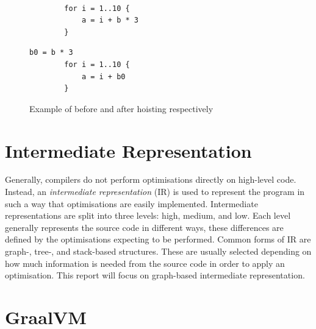 \documentclass[12pt,openany,a4paper]{book}
\begin{document}
\begin{figure}
    \begin{minipage}[l]{0.4\linewidth}
        \begin{lstlisting}[frame=single, basicstyle=\ttfamily\small, tabsize=1, columns=fullflexible]

        for i = 1..10 {
            a = i + b * 3
        }
        \end{lstlisting}
    \end{minipage}
    \hspace{0.18\textwidth}
    \begin{minipage}[l]{0.4\linewidth}
        \begin{lstlisting}[frame=single, basicstyle=\ttfamily\small, tabsize=1, columns=fullflexible]
        b0 = b * 3
        for i = 1..10 {
            a = i + b0
        }
        \end{lstlisting}
    \end{minipage}
    \caption{Example of before and after hoisting respectively}
    \label{hoist}
\end{figure}

\section{Intermediate Representation}
\label{ir}

Generally, compilers do not perform optimisations directly on high-level code.
Instead, an \emph{intermediate representation} (IR) is used to represent the
program in such a way that optimisations are easily implemented. Intermediate
representations are split into three levels: high, medium, and low. Each
level generally represents the source code in different ways, these differences
are defined by the optimisations expecting to be performed.
Common forms of IR are graph-, tree-, and stack-based structures. These are
usually selected depending on how much information is needed from the source
code in order to apply an optimisation.
This report will focus on graph-based intermediate representation.

\section{GraalVM}
\label{graal}
\end{document}
